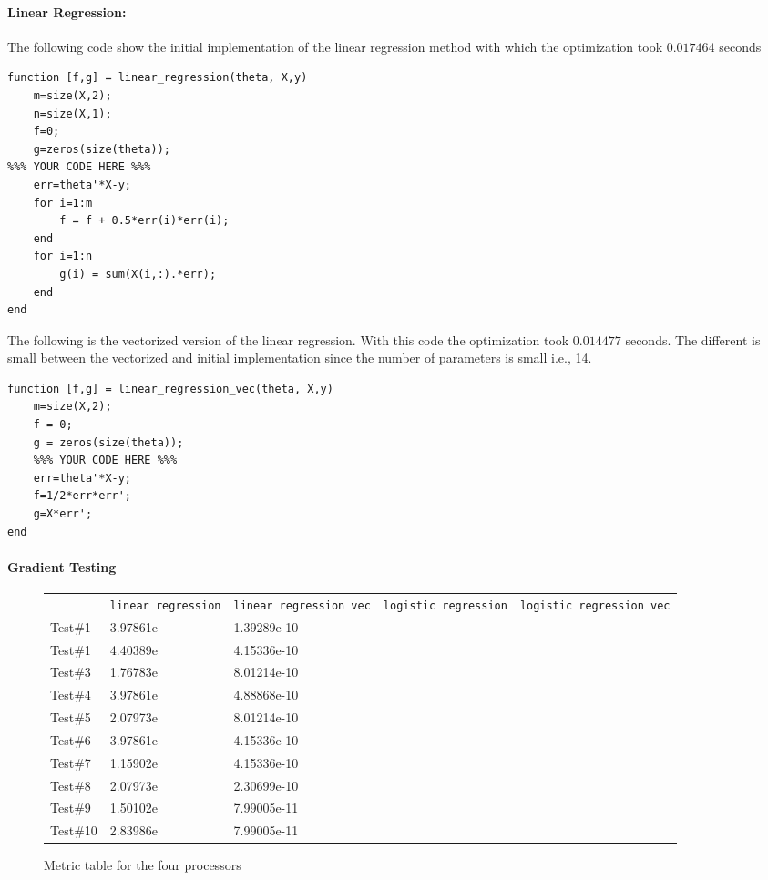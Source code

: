 \documentclass[12pt] {article}
\begin{document}
\paragraph{Linear Regression:}
The following code show the initial implementation of the linear regression method with which the optimization took $0.017464$ seconds

\begin{lstlisting}
function [f,g] = linear_regression(theta, X,y)
	m=size(X,2);
	n=size(X,1);
	f=0;
	g=zeros(size(theta));
%%% YOUR CODE HERE %%%
    err=theta'*X-y;
    for i=1:m
        f = f + 0.5*err(i)*err(i);
    end
    for i=1:n
        g(i) = sum(X(i,:).*err);
    end   
end
\end{lstlisting}

The following is the vectorized version of the linear regression. With this code the optimization took $0.014477$ seconds. The different is small between the vectorized and initial implementation since the number of parameters is small i.e., 14. 

\begin{lstlisting}
function [f,g] = linear_regression_vec(theta, X,y)
	m=size(X,2);  
	f = 0;
	g = zeros(size(theta));  
	%%% YOUR CODE HERE %%%
	err=theta'*X-y;
	f=1/2*err*err';
	g=X*err';
end
\end{lstlisting}

\paragraph{Gradient Testing}

\begin{figure}[!tbh]
 \centering    
\begin{tabular}{ |p{1.5cm}|| p{3cm}|p{3cm}|p{3cm}|p{3cm}|}
 \hline
 &  \texttt{linear regression} & \texttt{linear regression vec}  & \texttt{logistic regression} & \texttt{logistic regression vec}\\
  \hhline{|=|=|=|=|=|}
 \hline


 Test$\#$1  &3.97861e &1.39289e-10&  &   \\
 Test$\#$1  &4.40389e &4.15336e-10&  &   \\
 Test$\#$3  &1.76783e &8.01214e-10&  &   \\
 Test$\#$4  &3.97861e &4.88868e-10&  &   \\
 Test$\#$5  &2.07973e &8.01214e-10&  &   \\
 Test$\#$6  &3.97861e &4.15336e-10&  &   \\
 Test$\#$7  &1.15902e &4.15336e-10&  &   \\
 Test$\#$8  &2.07973e &2.30699e-10&  &   \\
 Test$\#$9  &1.50102e &7.99005e-11&  &   \\
 Test$\#$10 &2.83986e &7.99005e-11&  &   \\

\hline
\end{tabular} 
\caption{Metric table for the four processors}
   \label{tab:gtest}
\end{figure} 
\end{document}
